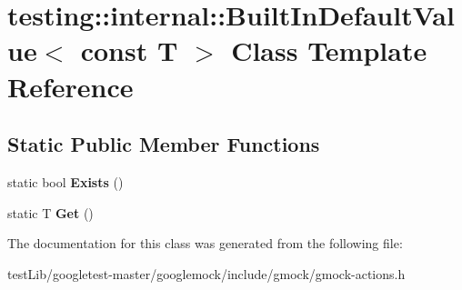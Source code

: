 \hypertarget{classtesting_1_1internal_1_1BuiltInDefaultValue_3_01const_01T_01_4}{}\section{testing\+:\+:internal\+:\+:Built\+In\+Default\+Value$<$ const T $>$ Class Template Reference}
\label{classtesting_1_1internal_1_1BuiltInDefaultValue_3_01const_01T_01_4}
\subsection*{Static Public Member Functions}
\begin{DoxyCompactItemize}
\item 
\mbox{\label{classtesting_1_1internal_1_1BuiltInDefaultValue_3_01const_01T_01_4_a1814803ec5dcc660ee1f1092a96b79fa}} 
static bool {\bfseries Exists} ()
\item 
\mbox{\label{classtesting_1_1internal_1_1BuiltInDefaultValue_3_01const_01T_01_4_a5996754952ecbcc5da77a2cebd4722de}} 
static T {\bfseries Get} ()
\end{DoxyCompactItemize}


The documentation for this class was generated from the following file\+:\begin{DoxyCompactItemize}
\item 
test\+Lib/googletest-\/master/googlemock/include/gmock/gmock-\/actions.\+h\end{DoxyCompactItemize}
